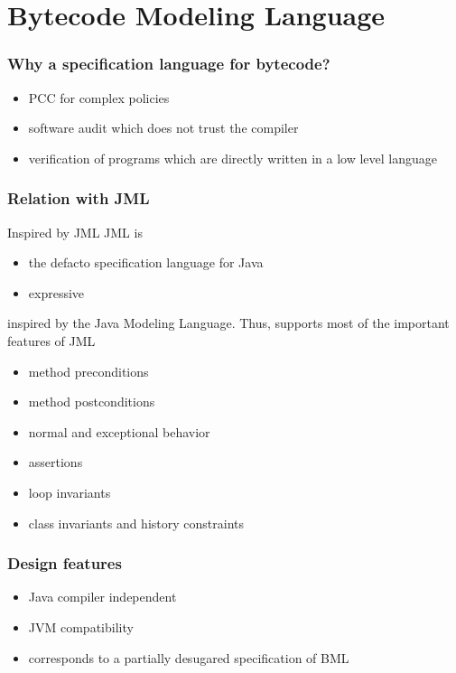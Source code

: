 \documentclass{beamer}
\begin{document}

\section{Bytecode Modeling Language}
\begin{frame}[shrink]
\frametitle{Why a specification language for bytecode?}
   \begin{itemize}
     \item PCC for complex policies 
     \item software audit which does not trust the compiler
     \item verification of programs which are directly written in a low level language
   \end{itemize}  
\end{frame}

\begin{frame}[shrink]\frametitle{Relation with JML}
  
  \begin{block}{Inspired by JML}
      JML is 
      \begin{itemize}
	  \item the defacto specification language for Java
	   \item expressive 
	\end{itemize}
  \end{block}

    inspired by the Java Modeling Language. Thus, supports most of the important features of JML
         \begin{itemize}
	    \item method preconditions
	     \item method postconditions
	      \item normal and exceptional behavior
	       \item assertions
	        \item loop invariants 
		 \item class invariants and history constraints 
	 \end{itemize}
        
\end{frame}


\begin{frame}[shrink]\frametitle{Design features}
\begin{itemize}
     \item Java compiler independent
     \item JVM compatibility
     \item corresponds to a partially desugared specification of BML   
   \end{itemize} 
\end{frame}
\end{document}
